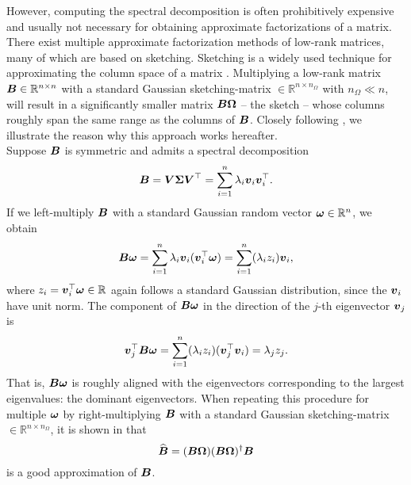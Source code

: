 However, computing the spectral
decomposition is often prohibitively expensive and usually not necessary for
obtaining approximate factorizations of a matrix. There exist multiple approximate
factorization methods of low-rank matrices, many of which are based on sketching.
Sketching is a widely used technique for approximating the column space of a matrix
\cite{halko2011finding,woodruff2014sketching,lin2017randomized,tropp2017sketching,tropp2023randomized}.
Multiplying a low-rank matrix $\boldsymbol{B} \in \mathbb{R}^{n \times n}$ with a standard Gaussian
\gls{sketching-matrix} $\in \mathbb{R}^{n \times n_{\Omega}}$ with $n_{\Omega} \ll n$, will
result in a significantly smaller matrix $\boldsymbol{B}\boldsymbol{\Omega}$ -- the sketch -- whose
columns roughly span the same range as the columns of $\boldsymbol{B}$.
Closely following \cite[section~2.1]{tropp2023randomized}, we illustrate the
reason why this approach works hereafter.\\

Suppose $\boldsymbol{B}$ is symmetric and admits a spectral decomposition
\begin{equation}
    \boldsymbol{B}
        = \boldsymbol{V} \boldsymbol{\Sigma} \boldsymbol{V}^{\top} 
        = \sum_{i=1}^n \lambda_i \boldsymbol{v}_i \boldsymbol{v}_i^{\top}.
    \label{equ:3-nystrom-sketching-spectral-decomposition}
\end{equation}
If we left-multiply $\boldsymbol{B}$ with a standard Gaussian random vector $\boldsymbol{\omega} \in \mathbb{R}^n$,
we obtain
\begin{equation}
    \boldsymbol{B}\boldsymbol{\omega}
        = \sum_{i=1}^n \lambda_i \boldsymbol{v}_i (\boldsymbol{v}_i^{\top} \boldsymbol{\omega})
        = \sum_{i=1}^n (\lambda_i  z_i) \boldsymbol{v}_i,
        \label{equ:3-nystrom-sketching-random-multiplication}
\end{equation}
where $z_i = \boldsymbol{v}_i^{\top} \boldsymbol{\omega} \in \mathbb{R}$ again follows a
standard Gaussian distribution, since the $\boldsymbol{v}_i$
have unit norm. The component of $\boldsymbol{B}\boldsymbol{\omega}$ in the direction of the
$j$-th eigenvector $\boldsymbol{v}_j$ is
\begin{equation}
    \boldsymbol{v}_j^{\top}\boldsymbol{B}\boldsymbol{\omega}
        = \sum_{i=1}^n (\lambda_i  z_i) (\boldsymbol{v}_j^{\top} \boldsymbol{v}_i)
        = \lambda_j  z_j.
        \label{equ:3-nystrom-sketching-dominant-component}
\end{equation}
That is, $\boldsymbol{B}\boldsymbol{\omega}$ is roughly aligned with the eigenvectors corresponding
to the largest eigenvalues: the dominant eigenvectors.
When repeating this procedure for multiple $\boldsymbol{\omega}$ by right-multiplying $\boldsymbol{B}$
with a standard Gaussian \gls{sketching-matrix} $\in \mathbb{R}^{n \times n_{\Omega}}$,
it is shown in \cite{halko2011finding} that
\begin{equation}
    \widehat{\boldsymbol{B}} = (\boldsymbol{B} \boldsymbol{\Omega}) (\boldsymbol{B} \boldsymbol{\Omega})^{\dagger} \boldsymbol{B}
    \label{equ:3-nystrom-RSVD}
\end{equation}
is a good approximation of $\boldsymbol{B}$.\\

